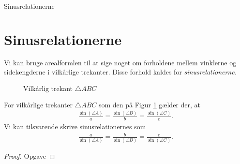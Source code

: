 
\begin{center}
\Huge
	Sinusrelationerne
\end{center}

\section*{Sinusrelationerne}



Vi kan bruge arealformlen til at sige noget om forholdene mellem vinklerne og sidelængderne i vilkårlige trekanter. Disse forhold kaldes for \textit{sinusrelationerne.}

\begin{figure}[H]
	\centering
	\caption{Vilkårlig trekant $\triangle ABC$}
	\label{fig:vilkårlig}
\end{figure}

\begin{setn}[Sinusrelationerne]
	\label{setn:sinusrelation}
	For vilkårlige trekanter $\triangle ABC$ som den på Figur \ref{fig:vilkårlig} gælder der, at 
	\begin{align}
		\label{eq:sin1}
		\frac{\sin(\angle A)}{a} = \frac{\sin(\angle B)}{b} = \frac{\sin(\angle C)}{c}.
	\end{align}
	Vi kan tilsvarende skrive sinusrelationernes som
	\begin{align}
		\label{eq:sin2}
		\frac{a}{\sin(\angle A)} = \frac{b}{\sin(\angle B)} = \frac{c}{\sin(\angle C)}.
	\end{align}
\end{setn}
\begin{proof}
	Opgave
\end{proof}

